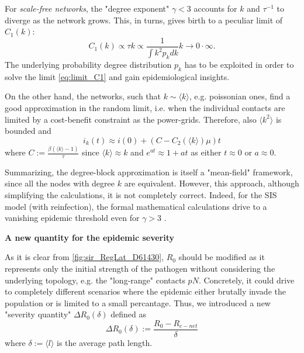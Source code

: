 \documentclass[a4paper,10pt,twoside]{book} %
\theoremstyle{definition}
\begin{document}
For \textit{scale-free networks}, the "degree exponent" $\gamma<3$ accounts for $k$ and $\tau^{-1}$ to diverge as the network grows. This, in turns, gives birth to a peculiar limit of $C_1(k)$: \vspace{3mm}
\begin{equation}
	C_1(k)\propto \tau k \propto \frac{1}{\int k^2 p_k dk}k  \to 0 \cdot \infty.
	\label{eq:limit_C1}
\end{equation}
The underlying probability degree distribution $p_k$ has to be exploited in order to solve the limit \autoref{eq:limit_C1} and gain epidemiological insights.

On the other hand, the networks, such that $k \sim \langle k \rangle$, e.g. poissonian ones, find a good approximation in the random limit, i.e. when the individual contacts are limited by a cost-benefit constraint as the power-grids. Therefore, also $\langle k^2 \rangle $ is bounded and
\begin{equation}
	i_k(t) \approx i(0)  + \left(C - C_2(\langle k \rangle )\mu \right) t
\end{equation}
where $C:= \frac{\beta (\langle k \rangle -1)}{\tau}$ since $\langle k \rangle \approx k$ and $e^{at}\approx1+at$ as either $t\approx0$ or $a \approx 0$.

Summarizing, the degree-block approximation is itself a "mean-field" framework, since all the nodes with degree $k$  are equivalent. However, this approach, although simplifying the calculations, it is not completely correct. Indeed, for the SIS model (with reinfection), the formal mathematical calculations drive to a vanishing epidemic threshold even for $\gamma>3$ \cite{barabasi::2016networkbook}.

\textbf{A new quantity for the epidemic severity} 

As it is clear from \autoref{fig:sir_RegLat_D61430}, $R_0$ should be modified as it represents only the initial strength of the pathogen without considering the underlying topology, e.g. the "long-range" contacts $pN$. Concretely, it could drive to completely different scenarios where the epidemic either brutally invade the population or is limited to a small percantage. Thus, we introduced a new "severity quantity" $ \Delta R_0 (\delta)$ defined as
\begin{equation}
	\Delta R_0 (\delta):= \frac{R_0 - R_{c-net}}{\delta}
	\label{eq:def_DR0delta}
\end{equation}
where $\delta:=\langle l \rangle $ is the average path length.
\end{document}
